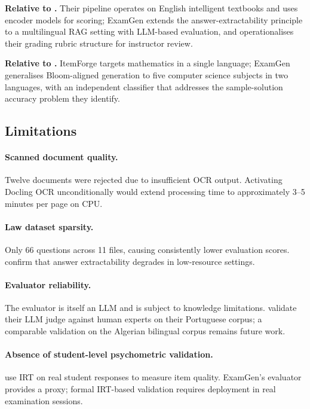 \documentclass[12pt, a4paper]{article}
\begin{document}
\textbf{Relative to \citet{morris2024aqg}.} Their pipeline operates on English
intelligent textbooks and uses encoder models for scoring; ExamGen extends the
answer-extractability principle to a multilingual RAG setting with LLM-based
evaluation, and operationalises their grading rubric structure for instructor review.

\textbf{Relative to \citet{meissner2024itemforge}.} ItemForge targets mathematics
in a single language; ExamGen generalises Bloom-aligned generation to five
computer science subjects in two languages, with an independent classifier that
addresses the sample-solution accuracy problem they identify.

\subsection{Limitations}

\paragraph{Scanned document quality.}
Twelve documents were rejected due to insufficient OCR output. Activating Docling
OCR unconditionally would extend processing time to approximately 3--5 minutes per
page on CPU.

\paragraph{Law dataset sparsity.}
Only 66 questions across 11 files, causing consistently lower evaluation scores.
\citet{morris2024aqg} confirm that answer extractability degrades in low-resource settings.

\paragraph{Evaluator reliability.}
The evaluator is itself an LLM and is subject to knowledge limitations.
\citet{mucciaccia2025mcq} validate their LLM judge against human experts on their
Portuguese corpus; a comparable validation on the Algerian bilingual corpus remains
future work.

\paragraph{Absence of student-level psychometric validation.}
\citet{isley2025quality} use IRT on real student responses to measure item quality.
ExamGen's evaluator provides a proxy; formal IRT-based validation requires deployment
in real examination sessions.
\end{document}
